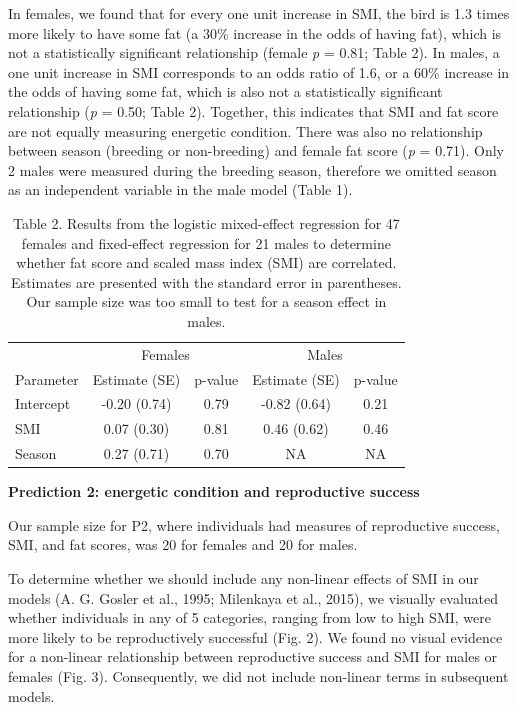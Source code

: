 \documentclass[
]{article}
\begin{document}
In females, we found that for every one unit increase in SMI, the bird
is 1.3 times more likely to have some fat (a 30\% increase in the odds
of having fat), which is not a statistically significant relationship
(female \emph{p} = 0.81; Table 2). In males, a one unit increase in SMI
corresponds to an odds ratio of 1.6, or a 60\% increase in the odds of
having some fat, which is also not a statistically significant
relationship (\emph{p} = 0.50; Table 2). Together, this indicates that
SMI and fat score are not equally measuring energetic condition. There
was also no relationship between season (breeding or non-breeding) and
female fat score (\emph{p} = 0.71). Only 2 males were measured during
the breeding season, therefore we omitted season as an independent
variable in the male model (Table 1).

\begin{table}

\caption{\label{tab:p1 results}Table 2. Results from the logistic mixed-effect regression for 47 females and fixed-effect regression for 21 males to determine whether fat score and scaled mass index (SMI) are correlated. Estimates are presented with the standard error in parentheses. Our sample size was too small to test for a season effect in males.}
\centering
\begin{tabular}[t]{l|c|c|c|c}
\hline
\multicolumn{1}{c|}{ } & \multicolumn{2}{c|}{Females} & \multicolumn{2}{c}{Males} \\
\cline{2-3} \cline{4-5}
Parameter & Estimate (SE) & p-value & Estimate (SE) & p-value\\
\hline
Intercept & -0.20 (0.74) & 0.79 & -0.82 (0.64) & 0.21\\
\hline
SMI & 0.07 (0.30) & 0.81 & 0.46 (0.62) & 0.46\\
\hline
Season & 0.27 (0.71) & 0.70 & NA & NA\\
\hline
\end{tabular}
\end{table}

\textbf{Prediction 2: energetic condition and reproductive success}

Our sample size for P2, where individuals had measures of reproductive
success, SMI, and fat scores, was 20 for females and 20 for males.

To determine whether we should include any non-linear effects of SMI in
our models (A. G. Gosler et al., 1995; Milenkaya et al., 2015), we
visually evaluated whether individuals in any of 5 categories, ranging
from low to high SMI, were more likely to be reproductively successful
(Fig. 2). We found no visual evidence for a non-linear relationship
between reproductive success and SMI for males or females (Fig. 3).
Consequently, we did not include non-linear terms in subsequent models.
\end{document}
